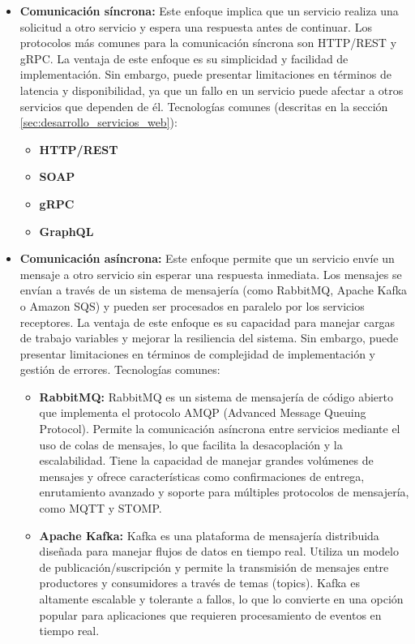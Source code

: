 \begin{itemize}
    \item \textbf{Comunicación síncrona:} Este enfoque implica que un servicio realiza una solicitud a otro servicio y espera una respuesta antes de continuar. Los protocolos más comunes para la comunicación síncrona son HTTP/REST y gRPC. La ventaja de este enfoque es su simplicidad y facilidad de implementación. Sin embargo, puede presentar limitaciones en términos de latencia y disponibilidad, ya que un fallo en un servicio puede afectar a otros servicios que dependen de él.
    Tecnologías comunes (descritas en la sección \ref{sec:desarrollo_servicios_web}):  
    \begin{itemize}
        \item \textbf{HTTP/REST}\cite{http_rest}
        \item \textbf{SOAP}\cite{soap}
        \item \textbf{gRPC}\cite{grpc}
        \item \textbf{GraphQL}\cite{graphql}
    \end{itemize}
    \item \textbf{Comunicación asíncrona:} Este enfoque permite que un servicio envíe un mensaje a otro servicio sin esperar una respuesta inmediata. Los mensajes se envían a través de un sistema de mensajería (como RabbitMQ, Apache Kafka o Amazon SQS) y pueden ser procesados en paralelo por los servicios receptores. La ventaja de este enfoque es su capacidad para manejar cargas de trabajo variables y mejorar la resiliencia del sistema. Sin embargo, puede presentar limitaciones en términos de complejidad de implementación y gestión de errores.
    Tecnologías comunes:
    \begin{itemize}
        \item \textbf{RabbitMQ\cite{rabbitmq}:} RabbitMQ es un sistema de mensajería de código abierto que implementa el protocolo AMQP (Advanced Message Queuing Protocol). Permite la comunicación asíncrona entre servicios mediante el uso de colas de mensajes, lo que facilita la desacoplación y la escalabilidad.
        Tiene la capacidad de manejar grandes volúmenes de mensajes y ofrece características como confirmaciones de entrega, enrutamiento avanzado y soporte para múltiples protocolos de mensajería, como MQTT y STOMP.
        \item \textbf{Apache Kafka\cite{kafka}:} Kafka es una plataforma de mensajería distribuida diseñada para manejar flujos de datos en tiempo real. Utiliza un modelo de publicación/suscripción y permite la transmisión de mensajes entre productores y consumidores a través de temas (topics). Kafka es altamente escalable y tolerante a fallos, lo que lo convierte en una opción popular para aplicaciones que requieren procesamiento de eventos en tiempo real.

\end{itemize}
\end{itemize}
